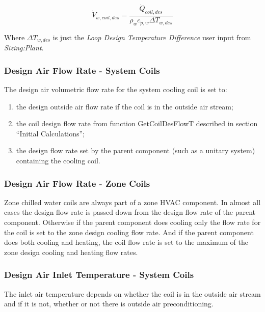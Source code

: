 \begin{equation}
\dot{V}_{w,coil,des} = \frac{\dot{Q}_{coil,des}}{\rho_w c_{p,w} \Delta T_{w,des}}
\end{equation}

Where \(\Delta T_{w,des}\) is just the \emph{Loop Design Temperature Difference} user input from \emph{Sizing:Plant}.

\subsubsection{Design Air Flow Rate - System Coils}\label{design-air-flow-rate---system-coils}

The design air volumetric flow rate for the system cooling coil is set to:

\begin{enumerate}
\def\labelenumi{\arabic{enumi}.}
\item
  the design outside air flow rate if the coil is in the outside air stream;
\item
  the coil design flow rate from function GetCoilDesFlowT described in section ``Initial Calculations'';
\item
  the design flow rate set by the parent component (such as a unitary system) containing the cooling coil.
\end{enumerate}

\subsubsection{Design Air Flow Rate - Zone Coils}\label{design-air-flow-rate---zone-coils}

Zone chilled water coils are always part of a zone HVAC component. In almost all cases the design flow rate is passed down from the design flow rate of the parent component. Otherwise if the parent component does cooling only the flow rate for the coil is set to the zone design cooling flow rate. And if the parent component does both cooling and heating, the coil flow rate is set to the maximum of the zone design cooling and heating flow rates.

\subsubsection{Design Air Inlet Temperature - System Coils}\label{design-air-inlet-temperature---system-coils}

The inlet air temperature depends on whether the coil is in the outside air stream and if it is not, whether or not there is outside air preconditioning.

